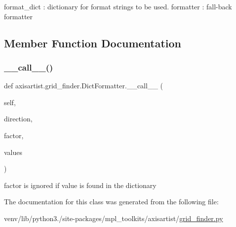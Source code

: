 \begin{DoxyVerb}format_dict : dictionary for format strings to be used.
formatter : fall-back formatter
\end{DoxyVerb}
 

\subsection{Member Function Documentation}
\mbox{\label{classaxisartist_1_1grid__finder_1_1DictFormatter_a68c716f35a9d2707fb1f7424fce51d36}} 
\subsubsection{\texorpdfstring{\+\_\+\+\_\+call\+\_\+\+\_\+()}{\_\_call\_\_()}}
{\footnotesize\ttfamily def axisartist.\+grid\+\_\+finder.\+Dict\+Formatter.\+\_\+\+\_\+call\+\_\+\+\_\+ (\begin{DoxyParamCaption}\item[{}]{self,  }\item[{}]{direction,  }\item[{}]{factor,  }\item[{}]{values }\end{DoxyParamCaption})}

\begin{DoxyVerb}factor is ignored if value is found in the dictionary
\end{DoxyVerb}
 

The documentation for this class was generated from the following file\+:\begin{DoxyCompactItemize}
\item 
venv/lib/python3./site-\/packages/mpl\+\_\+toolkits/axisartist/\hyperlink{axisartist_2grid__finder_8py}{grid\+\_\+finder.\+py}\end{DoxyCompactItemize}
